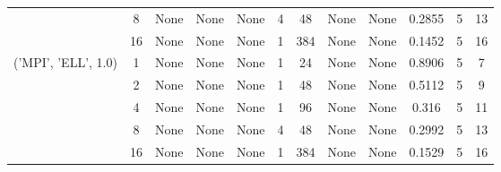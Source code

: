 \begin{tabular}{cccccccccccc}
& 8& None& None& None& 4& 48& None& None& 0.2855& 5& 13\\
& 16& None& None& None& 1& 384& None& None& 0.1452& 5& 16\\
\hline
\multirow{5}{*}{('MPI', 'ELL', 1.0)}& 1& None& None& None& 1& 24& None& None& 0.8906& 5& 7\\
& 2& None& None& None& 1& 48& None& None& 0.5112& 5& 9\\
& 4& None& None& None& 1& 96& None& None& 0.316& 5& 11\\
& 8& None& None& None& 4& 48& None& None& 0.2992& 5& 13\\
& 16& None& None& None& 1& 384& None& None& 0.1529& 5& 16\\
\hline
\end{tabular}



